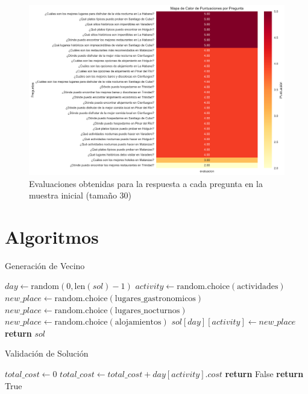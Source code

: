 \documentclass[10pt]{llncs}
\begin{document}
\begin{figure}
\centering
\includegraphics[width=1\textwidth]{../src/experiments/specialized_agents/quality_heatmap_20250617-171856.png}
\caption{Evaluaciones obtenidas para la respuesta a cada pregunta en la muestra inicial (tamaño 30)}
\label{fig:eval_2}
\end{figure}

\newpage
\section{Algoritmos}

\begin{algorithm}
\caption{Generación de Vecino}
\label{alg:nb_gen}
\begin{algorithmic}[1]
\State $day \gets \text{random}(0, \text{len}(sol)-1)$
\State $activity \gets \text{random.choice}(\text{actividades})$
    \State $new\_place \gets \text{random.choice}(\text{lugares\_gastronomicos})$
    \State $new\_place \gets \text{random.choice}(\text{lugares\_nocturnos})$
\Else
    \State $new\_place \gets \text{random.choice}(\text{alojamientos})$
\EndIf
\State $sol[day][activity] \gets new\_place$
\State \textbf{return} $sol$
\EndProcedure
\end{algorithmic}
\end{algorithm}

\begin{algorithm}
\caption{Validación de Solución}
\label{alg:sol_valid}
\begin{algorithmic}[1]
    \State $total\_cost \gets 0$
        \State $total\_cost \gets total\_cost + day[activity].cost$
    \EndFor
        \State \textbf{return} False
    \EndIf
\EndFor
\State \textbf{return} True
\EndProcedure
\end{algorithmic}
\end{algorithm}
\end{document}
